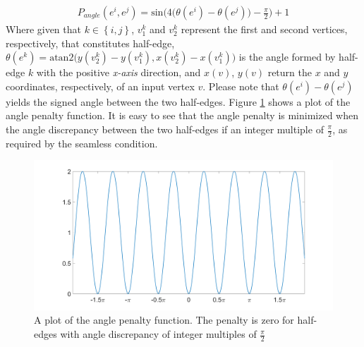 \begin{equation}\label{angle_penalty}
\begin{split}
P_{angle}\left(e^i,e^j\right) = \mathrm{sin} \bigg( 4\Big(\theta\left(e^i\right) - \theta\left(e^j\right)\Big) - \frac{\pi}{2}\bigg) + 1
\end{split}
\end{equation}
Where given that $k\in\left\{i,j\right\}$, $v^k_1$ and $v^k_2$ represent the first and second vertices, respectively, that constitutes half-edge, $\theta\left(e^k\right) = \mathrm{atan2}\Big(y\left(v^k_2\right) - y\left(v^k_1\right), x\left(v^k_2\right) - x\left(v^k_1\right)\Big)$ is the angle formed by half-edge $k$ with the positive \emph{x-axis} direction, and $x\left(v\right)$, $y\left(v\right)$ return the $x$ and $y$ coordinates, respectively, of an input vertex $v$. Please note that $\theta\left(e^i\right) - \theta\left(e^j\right)$ yields the signed angle between the two half-edges. Figure \ref{fig:angle_penalty} shows a plot of the angle penalty function. It is easy to see that the angle penalty is minimized when the angle discrepancy between the two half-edges if an integer multiple of $\frac{\pi}{2}$, as required by the seamless condition.

\begin{figure}[ht]
\centering
\includegraphics[width=15cm]{figures/seamless/angle_penalty_sin.png}
\caption[Angle Penalty]{A plot of the angle penalty function. The penalty is zero for half-edges with angle discrepancy of integer multiples of $\frac{\pi}{2}$}
\label{fig:angle_penalty}
\end{figure}